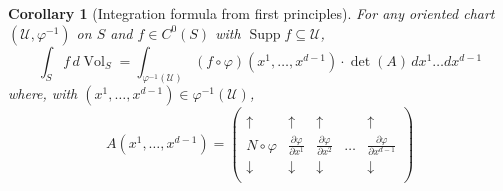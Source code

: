 \documentclass{article}
\newcommand\supp{\operatorname{Supp}}
\renewcommand\det{\operatorname{det}}
\newcommand{\p}{\partial}
\newcommand{\al}{\alpha}
\newcommand{\be}{\beta}
\newcommand{\f}[2]{\frac{#1}{#2}}
\newcommand{\lp}{\left(}
\newcommand{\rp}{\right)}
\theoremstyle{theorem}
\newtheorem{corollary}[theorem]{Corollary}
\newcommand{\Vol}{\operatorname{Vol}}
\begin{document}



\begin{corollary}[Integration formula from first principles]
For any oriented chart $(\mathcal{U},\varphi^{-1})$ on $S$ and $f\in C^0(S)$ with $\supp{f} \subseteq \mathcal{U}$,
\begin{equation*}
    \int_S f\,d\Vol_S = \int_{\varphi^{-1}(\mathcal{U})} (f\circ \varphi)(x^1,\dots,x^{d-1}) \cdot {\det{(A)}}\,dx^1\dots dx^{d-1} 
\end{equation*}
where, with $(x^1,\dots, x^{d-1}) \in \varphi^{-1}(\mathcal{U})$, 
\begin{equation*}
    A(x^1,\dots, x^{d-1}) = 
    \left(\begin{array}{c|cccc}
     & & &  &\\
    \uparrow &\uparrow & \uparrow &   &\uparrow \\ 
    N \circ \varphi &\f{\p \varphi}{\p x^1}& \f{\p \varphi}{\p x^2}  &\dots&\f{\p \varphi}{\p x^{d-1}}\\
    \downarrow  &\downarrow  & \downarrow &    &\downarrow \\ 
    &&& & 
    \end{array}\right)
\end{equation*}
\end{corollary}
\end{document}
